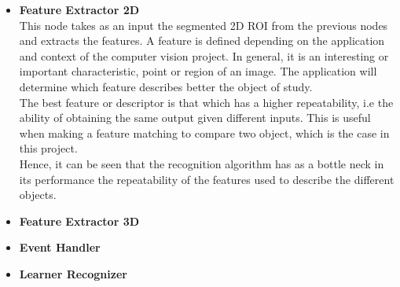 \begin{itemize}
	\item{\textbf{Feature Extractor 2D}}\\
This node takes as an input the segmented 2D ROI from the previous nodes and extracts the features. A feature is defined depending on the application and context of the computer vision project. In general, it is an interesting or important characteristic, point or region of an image. The application will determine which feature describes better the object of study. 
\\

The best feature or descriptor is that which has a higher repeatability, i.e the ability of obtaining the same output given different inputs. This is useful when making a feature matching to compare two object, which is the case in this project. 
\\

Hence, it can be seen that the recognition algorithm has as a bottle neck in its performance the repeatability of the features used to describe the different objects. 


	\item{\textbf{Feature Extractor 3D}}\\
	\item{\textbf{Event Handler}}\\
	\item{\textbf{Learner Recognizer}}\\
\end{itemize}
